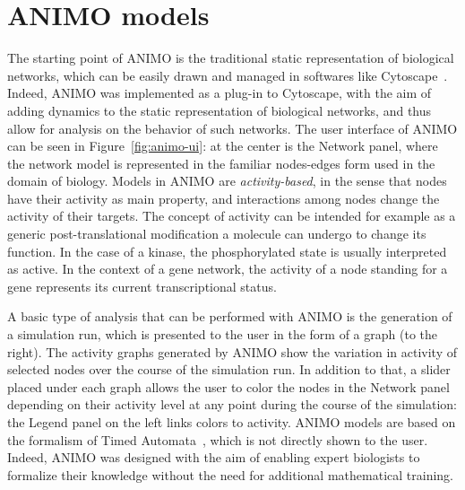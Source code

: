 \documentclass[submission,copyright,creativecommons]{eptcs}
\def\tas{Timed Automata}
\begin{document}
\section{ANIMO models}
The starting point of ANIMO is the traditional static representation of biological networks,
which can be easily drawn and managed in softwares like Cytoscape~\cite{cytoscape}. Indeed, ANIMO was implemented
as a plug-in to Cytoscape, with the aim of adding dynamics to the static representation of biological
networks, and thus allow for analysis on the behavior of such networks. The user interface of ANIMO
can be seen in Figure~\ref{fig:animo-ui}: at the center is the Network panel, where the network
model is represented in the familiar nodes-edges form used in the domain of biology.
Models in ANIMO are \emph{activity-based}, in the sense that nodes have their activity as main
property, and interactions among nodes change the activity of their targets. The concept of activity
can be intended for example as a generic post-translational modification a molecule can undergo to change its
function. In the case of a kinase, the phosphorylated state is usually interpreted as active.
In the context of a gene network, the activity of a node standing for a gene represents its current
transcriptional status.

A basic type of analysis that can be performed with ANIMO is the generation of
a simulation run, which is presented to the user in the form of a graph (to the right). The activity
graphs generated by ANIMO show the variation in activity of selected nodes over the course of the simulation run.
In addition to that, a slider placed under each graph allows the user to color the nodes in the Network panel
depending on their activity level at any point during the course of the simulation: the Legend
panel on the left links colors to activity. ANIMO models are based on the formalism of \tas~\cite{timed-automata-alur-dill},
which is not directly shown to the user. Indeed, ANIMO was designed with the aim of enabling expert biologists
to formalize their knowledge without the need for additional mathematical training.
\end{document}
